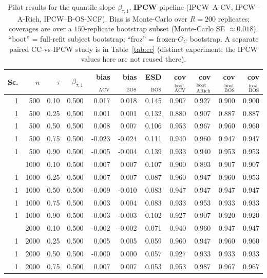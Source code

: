 \begin{table}[t]\centering\small
\caption{Pilot results for the quantile slope $\beta_{\tau,1}$, \textbf{IPCW}
pipeline (IPCW--A-CV, IPCW--A-Rich, IPCW--B-OS-NCF). Bias is
Monte-Carlo over $R=200$ replicates; coverages are over a $150$-replicate
bootstrap subset (Monte-Carlo SE $\approx0.018$).
``boot'' = full-refit subject bootstrap; ``froz'' = frozen-$G_C$ bootstrap.
A separate paired CC-vs-IPCW study is in Table~\ref{tab:cc} (distinct
experiment; the IPCW values here are not reused there).}
\label{tab:pilot}
\begin{tabular}{rrr r rr r rrrr}
\toprule
Sc. & $n$ & $\tau$ & $\beta_{\tau,1}$ & bias$_{\text{ACV}}$ & bias$_{\text{BOS}}$ & ESD$_{\text{BOS}}$ & cov$_{\text{ACV}}^{\text{boot}}$ & cov$_{\text{ARich}}^{\text{boot}}$ & cov$_{\text{BOS}}^{\text{boot}}$ & cov$_{\text{BOS}}^{\text{froz}}$ \\
\midrule
1 & 500 & 0.10 & 0.500 & 0.017 & 0.018 & 0.145 & 0.907 & 0.927 & 0.900 & 0.900 \\
1 & 500 & 0.25 & 0.500 & 0.001 & 0.001 & 0.132 & 0.880 & 0.907 & 0.887 & 0.887 \\
1 & 500 & 0.50 & 0.500 & 0.008 & 0.007 & 0.106 & 0.953 & 0.967 & 0.960 & 0.960 \\
1 & 500 & 0.75 & 0.500 & -0.023 & -0.024 & 0.111 & 0.940 & 0.960 & 0.947 & 0.947 \\
1 & 500 & 0.90 & 0.500 & -0.005 & -0.004 & 0.139 & 0.933 & 0.940 & 0.953 & 0.953 \\
\addlinespace
1 & 1000 & 0.10 & 0.500 & 0.007 & 0.007 & 0.107 & 0.900 & 0.893 & 0.907 & 0.907 \\
1 & 1000 & 0.25 & 0.500 & 0.007 & 0.007 & 0.087 & 0.960 & 0.947 & 0.960 & 0.953 \\
1 & 1000 & 0.50 & 0.500 & -0.009 & -0.010 & 0.083 & 0.947 & 0.947 & 0.947 & 0.947 \\
1 & 1000 & 0.75 & 0.500 & 0.003 & 0.004 & 0.083 & 0.933 & 0.953 & 0.933 & 0.933 \\
1 & 1000 & 0.90 & 0.500 & -0.003 & -0.003 & 0.102 & 0.927 & 0.907 & 0.920 & 0.920 \\
\addlinespace
1 & 2000 & 0.10 & 0.500 & -0.002 & -0.002 & 0.071 & 0.940 & 0.960 & 0.947 & 0.947 \\
1 & 2000 & 0.25 & 0.500 & 0.005 & 0.005 & 0.059 & 0.960 & 0.947 & 0.960 & 0.960 \\
1 & 2000 & 0.50 & 0.500 & -0.000 & 0.000 & 0.057 & 0.927 & 0.933 & 0.933 & 0.933 \\
1 & 2000 & 0.75 & 0.500 & 0.007 & 0.007 & 0.053 & 0.953 & 0.987 & 0.967 & 0.967 \\

\end{tabular}
\end{table}

